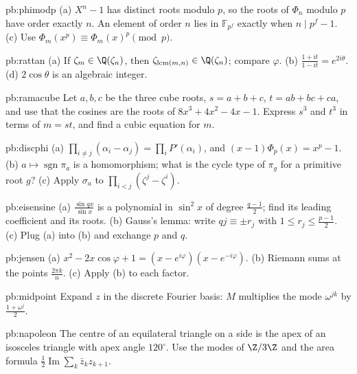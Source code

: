 \begin{hint}{pb:phimodp}
(a) $X^n-1$ has distinct roots modulo $p$, so the roots of $\Phi_n$ modulo $p$ have order exactly $n$. An element of order $n$
lies in $\mathbb F_{p^f}$ exactly when $n\mid p^f-1$. (c) Use $\Phi_m(x^p)\equiv\Phi_m(x)^p\pmod p$.
\end{hint}

\begin{hint}{pb:rattan}
(a) If $\zeta_m\in\Q(\zeta_n)$, then $\zeta_{\operatorname{lcm}(m,n)}\in\Q(\zeta_n)$; compare $\varphi$. (b)
$\frac{1+it}{1-it}=e^{2i\theta}$. (d) $2\cos\theta$ is an algebraic integer.
\end{hint}

\begin{hint}{pb:ramacube}
Let $a,b,c$ be the three cube roots, $s=a+b+c$, $t=ab+bc+ca$, and use that the cosines are the roots of
$8x^3+4x^2-4x-1$. Express $s^3$ and $t^3$ in terms of $m=st$, and find a cubic equation for $m$.
\end{hint}

\begin{hint}{pb:discphi}
(a) $\prod_{i\ne j}(\alpha_i-\alpha_j)=\prod_iP'(\alpha_i)$, and $(x-1)\Phi_p(x)=x^p-1$. (b) $a\mapsto\operatorname{sgn}\pi_a$
is a homomorphism; what is the cycle type of $\pi_g$ for a primitive root $g$? (c) Apply $\sigma_a$ to
$\prod_{i<j}(\zeta^j-\zeta^i)$.
\end{hint}

\begin{hint}{pb:eisensine}
(a) $\frac{\sin qx}{\sin x}$ is a polynomial in $\sin^2x$ of degree $\frac{q-1}2$; find its leading coefficient and its
roots. (b) Gauss's lemma: write $qj\equiv\pm r_j$ with $1\le r_j\le\frac{p-1}2$. (c) Plug (a) into (b) and exchange $p$
and $q$.
\end{hint}

\begin{hint}{pb:jensen}
(a) $x^2-2x\cos\varphi+1=(x-e^{i\varphi})(x-e^{-i\varphi})$. (b) Riemann sums at the points $\frac{2\pi k}n$. (c) Apply (b)
to each factor.
\end{hint}

\begin{hint}{pb:midpoint}
Expand $z$ in the discrete Fourier basis: $M$ multiplies the mode $\omega^{jk}$ by $\frac{1+\omega^j}2$.
\end{hint}

\begin{hint}{pb:napoleon}
The centre of an equilateral triangle on a side is the apex of an isosceles triangle with apex angle $120^\circ$. Use the
modes of $\Z/3\Z$ and the area formula $\frac12\operatorname{Im}\sum_k\bar z_kz_{k+1}$.
\end{hint}


